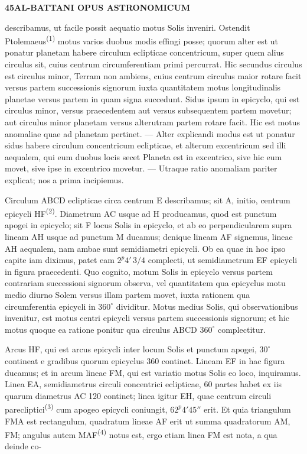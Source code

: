 \documentclass[10pt]{article}
\newcommand{\A}[1]{\hypertarget{#1}{}}
\newcommand{\NM}[1]{\textsuperscript{(#1)}}
\newcommand{\SP}[3]{%
  \clearpage
  \A{AB01-PDF#1}%
  \begin{center}\textbf{#2\quad #3}\end{center}%
}
\begin{document}

\SP{0134}{45}{AL-BATTANI OPUS ASTRONOMICUM}

\A{AB01-PDF0134-P01}
describamus, ut facile possit aequatio motus Solis inveniri.
Ostendit Ptolemaeus\NM{1} motus varios duobus modis effingi
posse; quorum alter est ut ponatur planetam habere circulum
eclipticae concentricum, super quem alius circulus sit, cuius
centrum circumferentiam primi percurrat. Hic secundus circulus
est circulus minor, Terram non ambiens, cuius centrum circulus
maior rotare facit versus partem successionis signorum iuxta
quantitatem motus longitudinalis planetae versus partem in
quam signa succedunt. Sidus ipsum in epicyclo, qui est circulus
minor, versus praecedentem aut versus subsequentem partem
movetur; aut circulus minor planetam versus alterutram partem
rotare facit. Hic est motus anomaliae quae ad planetam pertinet.
— Alter explicandi modus est ut ponatur sidus habere circulum
concentricum eclipticae, et alterum excentricum sed illi
aequalem, qui eum duobus locis secet Planeta est in excentrico,
sive hic eum movet, sive ipse in excentrico movetur.
— Utraque ratio anomaliam pariter explicat; nos a prima
incipiemus.


\A{AB01-PDF0134-P02}
Circulum ABCD eclipticae circa centrum E describamus; sit A,
initio, centrum epicycli HF\NM{2}. Diametrum AC usque ad H
producamus, quod est punctum apogei in epicyclo; sit F locus
Solis in epicyclo, et ab eo perpendicularem supra lineam AH
usque ad punctum M ducamus; denique lineam AF signemus,
lineae AH aequalem, nam ambae sunt semidiametri epicycli.
Ob ea quae in hoc ipso capite iam diximus, patet eam
$2^{p}4'\,3/4$ complecti, ut semidiametrum EF epicycli in
figura praecedenti. Quo cognito, motum Solis in epicyclo versus
partem contrariam successioni signorum observa, vel quantitatem
qua epicyclus motu medio diurno Solem versus illam partem
movet, iuxta rationem qua circumferentia epicycli in
$360^\circ$ dividitur. Motus medius Solis, qui observationibus
invenitur, est motus centri epicycli versus partem successionis
signorum; et hic motus quoque ea ratione ponitur qua circulus
ABCD $360^\circ$ complectitur.

\A{AB01-PDF0134-P03}
Arcus HF, qui est arcus epicycli inter locum Solis et punctum
apogei, $30^\circ$ contineat e gradibus quorum epicyclus 360
continet. Lineam EF in hac figura ducamus; et in arcum lineae
FM, qui est variatio motus Solis eo loco, inquiramus.
Linea EA, semidiametrus circuli concentrici eclipticae, 60
partes habet ex iis quarum diametrus AC 120 continet; linea
igitur EH, quae centrum circuli parecliptici\NM{3} cum apogeo
epicycli coniungit, $62^{p}4'45''$ erit. Et quia triangulum FMA
est rectangulum, quadratum lineae AF erit ut summa quadratorum
AM, FM; angulus autem MAF\NM{4} notus est, ergo etiam linea
FM est nota, a qua deinde co-
\end{document}
